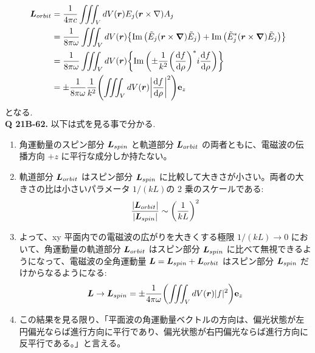 \documentclass[uplatex,dvipdfmx,a4paper,11pt]{jlreq}
\newcommand{\rr}{\bm{r}}
\theoremstyle{definition}
\begin{document}
\begin{align}
  \LL_{orbit} & = \frac{1}{4\pi c}\iiint_VdV(\rr)E_j(\rr\times\nabla)A_j                                                                   \\
              & = \frac{1}{8\pi\omega}\iiint_VdV(\rr)\qty{\Im\qty(\Et_j(\rr\times\vnabla)\Et_j) + \Im\qty(\Et_j^*(\rr\times\vnabla)\Et_j)} \\
              & = \frac{1}{8\pi\omega}\iiint_VdV(\rr)\qty{\Im\qty(\pm\frac{1}{k^2}\qty(\dv{f}{\rho})^*\ii\dv{f}{\rho})}                    \\
              & = \pm\frac{1}{8\pi\omega}\frac{1}{k^2}\qty(\iiint_VdV(\rr)\qty|\dv{f}{\rho}|^2)\vb{e}_z
\end{align}
となる. \\

\textbf{Q 21B-62.}
以下は式を見る事で分かる.
\begin{enumerate}
  \item 角運動量のスピン部分 $\bm{L}_{spin}$ と軌道部分 $\bm{L}_{orbit}$ の両者ともに、電磁波の伝播方向 $+z$ に平行な成分しか持たない。
  \item 軌道部分 $\bm{L}_{orbit}$ はスピン部分 $\bm{L}_{spin}$ に比較して大きさが小さい。両者の大きさの比は小さいパラメータ $1/(kL)$の 2 乗のスケールである:
        \begin{align}
          \frac{|\bm{L}_{orbit}|}{|\bm{L}_{spin}|} \sim \qty(\frac{1}{kL})^2
        \end{align}
  \item よって、xy 平面内での電磁波の広がりを大きくする極限 $1/(kL) \to 0$ において、角運動量の軌道部分 $\bm{L}_{orbit}$ はスピン部分 $\bm{L}_{spin}$ に比べて無視できるようになって、電磁波の全角運動量 $\bm{L} = \bm{L}_{spin} + \bm{L}_{orbit}$ はスピン部分 $\bm{L}_{spin}$ だけからなるようになる:
        \begin{align}
          \LL \to \LL_{spin} = \pm \frac{1}{4\pi\omega}\qty(\iiint_VdV(\rr)|f|^2)\vb{e}_z \label{L limit}
        \end{align}
  \item この結果を見る限り、「平面波の角運動量ベクトルの方向は、偏光状態が左円偏光ならば進行方向に平行であり、偏光状態が右円偏光ならば進行方向に反平行である。」と言える。
\end{enumerate}
\end{document}
